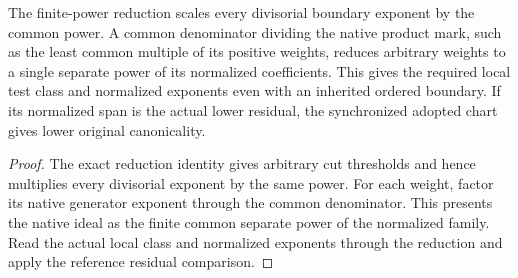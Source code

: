 \begin{theorem}
\label{hir:g8-native-common-denominator-boundary-reduction}
\leanok
The finite-power reduction scales every divisorial boundary
exponent by the common power. A common denominator dividing
the native product mark, such as the least common multiple of
its positive weights, reduces arbitrary weights to a single
separate power of its normalized coefficients. This gives the
required local test class and normalized exponents even with an
inherited ordered boundary. If its normalized span is the actual
lower residual, the synchronized adopted chart gives lower
original canonicality.
\end{theorem}
\begin{proof}
The exact reduction identity gives arbitrary cut thresholds
and hence multiplies every divisorial exponent by the same power.
For each weight, factor its native generator exponent through
the common denominator. This presents the native ideal as the
finite common separate power of the normalized family. Read
the actual local class and normalized exponents through the
reduction and apply the reference residual comparison.
\end{proof}

